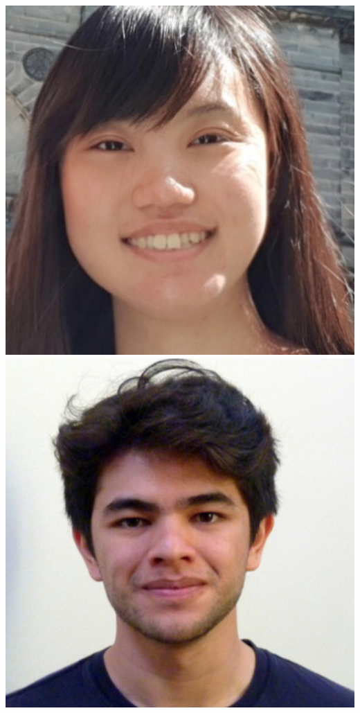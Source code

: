 \documentclass[aspectratio=169]{beamer}
\begin{document}
\begin{frame}
{            \includegraphics[width=0.1\textheight]{figures/students/dily_ong.jpg}%
            \includegraphics[width=0.1\textheight]{figures/students/ian_roque.jpg}%
}
\end{frame}
\end{document}
